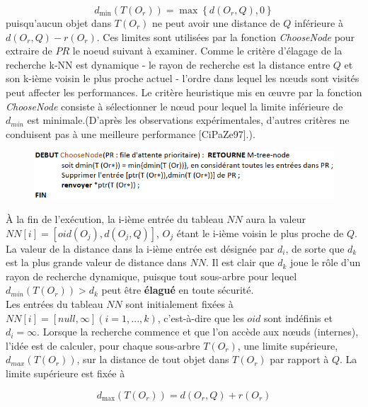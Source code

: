 \begin{equation}
    d_{\min}(T(O_r)) = \max \left\{d(O_r, Q), 0\right\}
\end{equation}
puisqu'aucun objet dans $ T(O_r) $ ne peut avoir une distance de $  Q  $ inférieure à $ d(O_r, Q)-r(O_r) $.
Ces limites sont utilisées par la fonction \textit{ChooseNode} pour extraire de $ PR $ le noeud suivant à examiner. Comme le critère d'élagage de la recherche k-NN est dynamique - le rayon de recherche est la distance entre $ Q $ et son k-ième voisin le plus proche actuel - l'ordre dans lequel les nœuds sont visités peut affecter les performances. Le critère heuristique mis en œuvre par la fonction \textit{ChooseNode} consiste à sélectionner le nœud pour lequel la limite inférieure de $ d_{min} $ est minimale.(D'après les observations expérimentales, d'autres critères ne conduisent pas à une meilleure performance [CiPaZe97].).
\begin{figure}[H]
	\centering
	\includegraphics[width=.9 \textwidth]{Figures/choosenode.png} %
\end{figure} 


À la fin de l'exécution, la i-ième entrée du tableau $ NN $ aura la valeur $ NN[i] = [oid(O_j),d(O_j, Q)] $, $ O_j $ étant le i-ième voisin le plus proche de $ Q $. La valeur de la distance dans la i-ième entrée est désignée par $ d_i $, de sorte que $ d_k $ est la plus grande valeur de distance dans $ NN $. Il est clair que $ d_k $ joue le rôle d'un rayon de recherche dynamique, puisque tout sous-arbre pour lequel $ d_{min}(T(O_r)) > d_k $ peut être \textbf{élagué} en toute sécurité.\\

Les entrées du tableau $ NN $ sont initialement fixées à $ NN[i] = [null ,\infty] (i= 1,..., k) $, c'est-à-dire que les $ oid $ sont indéfinis et $ d_i = \infty $. Lorsque la recherche commence et que l'on accède aux nœuds (internes), l'idée est de calculer, pour chaque sous-arbre $ T(O_r) $, une limite supérieure, $ d_{max}(T(O_r)) $, sur la distance de tout objet dans $ T(O_r) $ par rapport à $ Q $. La limite supérieure est fixée à

\begin{equation}
d_{\max}(T(O_r)) =  d(O_r, Q)+r(O_r)
\end{equation}

